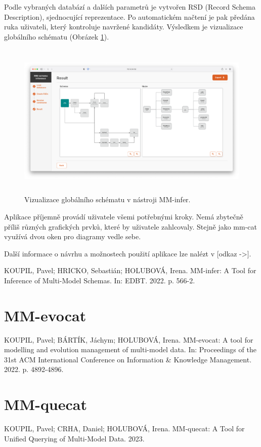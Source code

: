 Podle vybraných databází a dalších parametrů je vytvořen RSD (Record Schema Description), sjednocující reprezentace. Po automatickém načtení je pak předána ruka uživateli, který kontroluje navržené kandidáty. Výsledkem je vizualizace globálního schématu (Obrázek \ref{obr01:mm-infer-result}).

\begin{figure}[htb]
  \centering
  \includegraphics[height=75mm]{../img/mm-infer-result}
  \caption{Vizualizace globálního schématu v nástroji MM-infer.}
  \label{obr01:mm-infer-result}
\end{figure}

Aplikace příjemně provádí uživatele všemi potřebnými kroky. Nemá zbytečně příliš různých grafických prvků, které by uživatele zahlcovaly. Stejně jako mm-cat využívá dvou oken pro diagramy vedle sebe.

Další informace o návrhu a možnostech použití aplikace lze nalézt v [odkaz ->].

KOUPIL, Pavel; HRICKO, Sebastián; HOLUBOVÁ, Irena. MM-infer: A Tool for Inference of Multi-Model Schemas. In: EDBT. 2022. p. 566-2.

\section{MM-evocat}

KOUPIL, Pavel; BÁRTÍK, Jáchym; HOLUBOVÁ, Irena. MM-evocat: A tool for modelling and evolution management of multi-model data. In: Proceedings of the 31st ACM International Conference on Information \& Knowledge Management. 2022. p. 4892-4896.




\section{MM-quecat}

KOUPIL, Pavel; CRHA, Daniel; HOLUBOVÁ, Irena. MM-quecat: A Tool for Unified Querying of Multi-Model Data. 2023.
